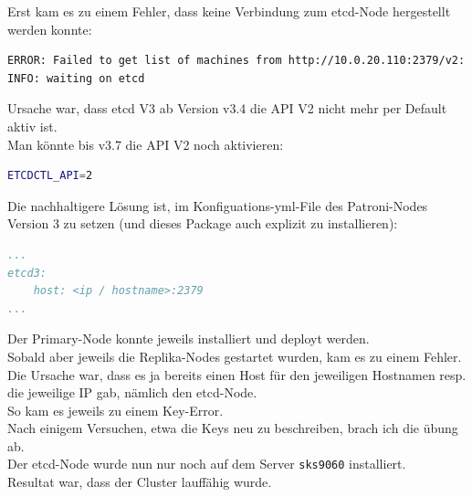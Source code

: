 \begin{flushleft}
    Erst kam es zu einem Fehler, dass keine Verbindung zum \gls{etcd}-Node hergestellt werden konnte:
\lstset{style=gra_codestyle}
\begin{lstlisting}[language=bash, caption=Patroni - etcd API V2 Error,captionpos=b,label={lst:patroni_etcd_api_v2_error},breaklines=true]
ERROR: Failed to get list of machines from http://10.0.20.110:2379/v2: EtcdException('Bad response : 404 page not found\n')
INFO: waiting on etcd
\end{lstlisting}
    Ursache war, dass \gls{etcd} V3 ab Version v3.4 die API V2 nicht mehr per Default aktiv ist.\\
    Man könnte bis v3.7 die API V2 noch aktivieren:
\lstset{style=gra_codestyle}
\begin{lstlisting}[language=bash, caption=Patroni - etcd API V2 Enable,captionpos=b,label={lst:patroni_etcd_api_v2_enable},breaklines=true]
ETCDCTL_API=2
\end{lstlisting}
    Die nachhaltigere Lösung ist, im Konfiguations-yml-File des Patroni-Nodes Version 3 zu setzen (und dieses Package auch explizit zu installieren):
\lstset{style=gra_codestyle}
\begin{lstlisting}[language=yaml, caption=Patroni - etcd3 Flag,captionpos=b,label={lst:patroni_etcd3_flag},breaklines=true]
...
etcd3:
    host: <ip / hostname>:2379
...
\end{lstlisting}
\end{flushleft}
\begin{flushleft}
    Der Primary-Node konnte jeweils installiert und deployt werden.\\
    Sobald aber jeweils die Replika-Nodes gestartet wurden, kam es zu einem Fehler.\\
    Die Ursache war, dass es ja bereits einen Host für den jeweiligen Hostnamen resp.
    die jeweilige IP gab, nämlich den \gls{etcd}-Node.\\
    So kam es jeweils zu einem Key-Error.\\
    Nach einigem Versuchen, etwa die Keys neu zu beschreiben, brach ich die übung ab.\\
    Der \gls{etcd}-Node wurde nun nur noch auf dem Server \texttt{sks9060} installiert.\\
    Resultat war, dass der Cluster lauffähig wurde.\\
\end{flushleft}
